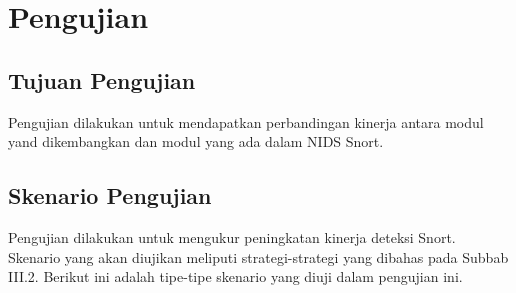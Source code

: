 


\section{Pengujian}

  \subsection{Tujuan Pengujian}
    Pengujian dilakukan untuk mendapatkan perbandingan kinerja antara modul yand dikembangkan dan modul yang ada dalam NIDS Snort. 

  \subsection{Skenario Pengujian}
  
  Pengujian dilakukan untuk mengukur peningkatan kinerja deteksi Snort. Skenario yang akan diujikan meliputi strategi-strategi yang dibahas pada Subbab III.2. Berikut ini adalah tipe-tipe skenario yang diuji dalam pengujian ini.


